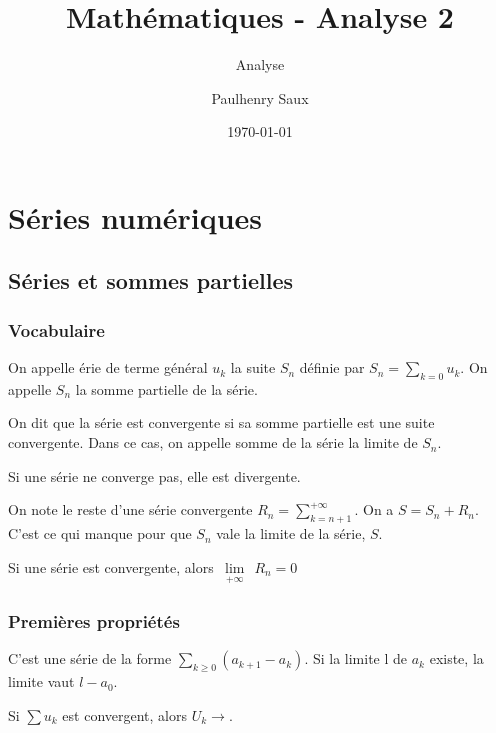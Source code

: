 \documentclass[french]{yLectureNote}
\title{Mathématiques - Analyse 2}
\subtitle{Analyse}
\author{Paulhenry Saux}
\date{\today}
\newcommand{\Lim}[1]{\lim\limits_{\substack{#1}}\:}
\begin{document}
\setcounter{chapter}{2}

	\chapter{Séries numériques }
\section{Séries et sommes partielles}
\subsection{Vocabulaire}
\begin{definition}
On appelle érie de terme général \(u_k\) la suite \(S_n\) définie par \(S_n = \sum_{k=0}u_k\). On appelle \(S_n\) la somme partielle de la série.
\end{definition}
\begin{definition}
On dit que la série est convergente si sa somme partielle est une suite convergente. Dans ce cas, on appelle somme de la série la limite de \(S_n\).
\end{definition}
Si une série ne converge pas, elle est divergente.
\begin{definition}[reste]
On note le reste d'une série convergente \(R_n = \sum_{k=n+1}^{+\infty}\). On a \(S = S_n+R_n\). C'est ce qui manque pour que \(S_n\) vale la limite de la série, \(S\).
\end{definition}
\begin{proposition}
Si une série est convergente, alors \(\Lim{+\infty} R_n = 0\)
\end{proposition}
\subsection{Premières propriétés}
\begin{proposition}
C'est une série de la forme \(\sum_{k\geq 0} (a_{k+1}-a_k)\). Si la limite l de \(a_k\) existe, la limite vaut \(l-a_0\).
\end{proposition}
\begin{proposition}
Si $\sum u_k$ est convergent, alors $U_k \to$.
\end{proposition}
\end{document}
